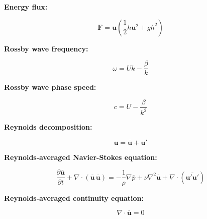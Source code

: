 \documentclass[12pt]{article}
\numberwithin{equation}{section}
\numberwithin{figure}{section}
\numberwithin{table}{section}
\begin{document}
\textbf{Energy flux:}

\begin{equation}
  \mathbf{F} = \mathbf{u} \left( \frac{1}{2} h\mathbf{u}^2 + gh^2\right)
\end{equation}

\textbf{Rossby wave frequency:}

\begin{equation}
  \omega = Uk - \frac{\beta}{k}
\end{equation}

\textbf{Rossby wave phase speed:}

\begin{equation}
  c = U - \frac{\beta}{k^2}
\end{equation}

\textbf{Reynolds decomposition:}

\begin{equation}
  \mathbf{u} = \overline{\mathbf{u}} + \mathbf{u}'
\end{equation}

\textbf{Reynolds-averaged Navier-Stokes equation:}

\begin{equation}
  \frac{\partial \overline{\mathbf{u}}}{\partial t} +
  \nabla \cdot \left( \overline{\mathbf{u}}\, \overline{\mathbf{u}} \right) =
  - \frac{1}{\rho} \nabla \overline{p} +
  \nu \nabla^2 \overline{\mathbf{u}} +
  \nabla \cdot \left( \overline{\mathbf{u}' \mathbf{u}'} \right)
\end{equation}

\textbf{Reynolds-averaged continuity equation:}

\begin{equation}
  \nabla \cdot \overline{\mathbf{u}} = 0
\end{equation}

\printindex
\end{document}
